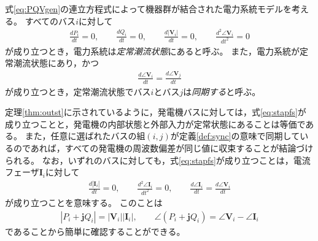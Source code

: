 \documentclass[tombow,dvipdfmx]{corona-a5}
\begin{document}
\begin{定義}\label{def:sync}
式\ref{eq:PQVgen}の連立方程式によって機器群が結合された電力系統モデルを考える。
すべてのバス$i$に対して
\begin{align}\label{eq:stapfs}
\frac{dP_i}{dt}=0
,\qquad
\frac{dQ_i}{dt}=0
,\qquad
\frac{d|\bm{V}_i|}{dt}=0
,\qquad
\frac{d^2 \angle \bm{V}_i }{dt^2}=0
\end{align}
が成り立つとき，電力系統は\emph{定常潮流状態}にあると呼ぶ。
また，電力系統が定常潮流状態にあり，かつ
\begin{align}\label{eq:defsyn}
\frac{d \angle \bm{V}_i}{dt} =  \frac{d \angle \bm{V}_j}{dt}
\end{align}
が成り立つとき，定常潮流状態でバス$i$とバス$j$は\emph{同期する}と呼ぶ。
\end{定義}

定理\ref{thm:outst}に示されているように，発電機バスに対しては，式\ref{eq:stapfs}が成り立つことと，発電機の内部状態と外部入力が定常状態にあることは等価である。
また，任意に選ばれたバスの組$(i,j)$が定義\ref{def:sync}の意味で同期しているのであれば，すべての発電機の周波数偏差が同じ値に収束することが結論づけられる。
なお，いずれのバスに対しても，式\ref{eq:stapfs}が成り立つことは，電流フェーザ$\bm{I}_i$に対して
\begin{align*}
\frac{d|\bm{I}_i|}{dt}=0
,\qquad
\frac{d^2 \angle \bm{I}_i }{dt^2}=0
,\qquad
\frac{d \angle \bm{I}_i }{dt} = \frac{d \angle \bm{V}_i }{dt} 
\end{align*}
が成り立つことを意味する。
このことは
\begin{align*}
|P_i + \bm{j} Q_i| = |\bm{V}_i| |\bm{I}_i|
,\qquad
\angle(P_i + \bm{j} Q_i) = \angle \bm{V}_i - \angle \bm{I}_i
\end{align*}
であることから簡単に確認することができる。
\end{document}

